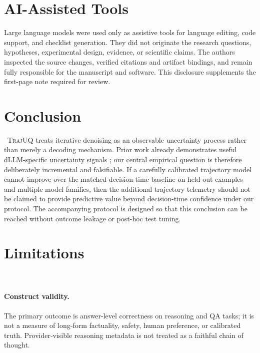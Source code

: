 \documentclass[10pt]{article}
\newcommand{\method}{\textsc{TrajUQ}\xspace}
\begin{document}
\section*{AI-Assisted Tools}

Large language models were used only as assistive tools for language editing, code support, and checklist generation. They did not originate the research questions, hypotheses, experimental design, evidence, or scientific claims. The authors inspected the source changes, verified citations and artifact bindings, and remain fully responsible for the manuscript and software. This disclosure supplements the first-page note required for review.

\section{Conclusion}

\ConclusionResultSentence\ 
\method treats iterative denoising as an observable uncertainty process rather than merely a decoding mechanism.
Prior work already demonstrates useful dLLM-specific uncertainty signals \citep{zhong2026dise,vazhentsev2026dllmuq}; our central empirical question is therefore deliberately incremental and falsifiable. If a carefully calibrated trajectory model cannot improve over the matched decision-time baseline on held-out examples and multiple model families, then the additional trajectory telemetry should not be claimed to provide predictive value beyond decision-time confidence under our protocol.
The accompanying protocol is designed so that this conclusion can be reached without outcome leakage or post-hoc test tuning.

\section*{Limitations}

\PaperStateLimitationsSentence\ 
\paragraph{Construct validity.} The primary outcome is answer-level correctness on reasoning and QA tasks; it is not a measure of long-form factuality, safety, human preference, or calibrated truth. Provider-visible reasoning metadata is not treated as a faithful chain of thought.
\end{document}
